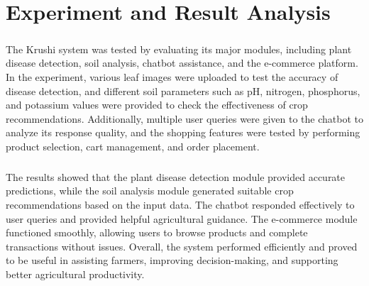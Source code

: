 \chapter{Experiment and Result Analysis}
\paragraph{}The Krushi system was tested by evaluating its major modules, including plant disease detection, soil analysis, chatbot assistance, and the e-commerce platform. In the experiment, various leaf images were uploaded to test the accuracy of disease detection, and different soil parameters such as pH, nitrogen, phosphorus, and potassium values were provided to check the effectiveness of crop recommendations. Additionally, multiple user queries were given to the chatbot to analyze its response quality, and the shopping features were tested by performing product selection, cart management, and order placement.
\paragraph{}The results showed that the plant disease detection module provided accurate predictions, while the soil analysis module generated suitable crop recommendations based on the input data. The chatbot responded effectively to user queries and provided helpful agricultural guidance. The e-commerce module functioned smoothly, allowing users to browse products and complete transactions without issues. Overall, the system performed efficiently and proved to be useful in assisting farmers, improving decision-making, and supporting better agricultural productivity.

